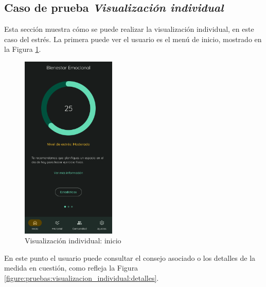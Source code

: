             \clearpage  %
            
        \subsection*{Caso de prueba \textit{Visualización individual}}
            Esta sección muestra cómo se puede realizar la visualización individual, en este caso del estrés. La primera puede ver el usuario es el menú de inicio, mostrado en la Figura \ref{figure:pruebas:visualizacion_individual:inicio}.

            \begin{figure}[h]
                \centering
                \includegraphics[width=0.4\textwidth]{figures/pruebas/visualizacion_individual/Inicio estres.png}
                \caption{Visualización individual: inicio}
                \label{figure:pruebas:visualizacion_individual:inicio}
            \end{figure}

            En este punto el usuario puede consultar el consejo asociado o los detalles de la medida en cuestión, como refleja la Figura \ref{figure:pruebas:visualizacion_individual:detalles}.

